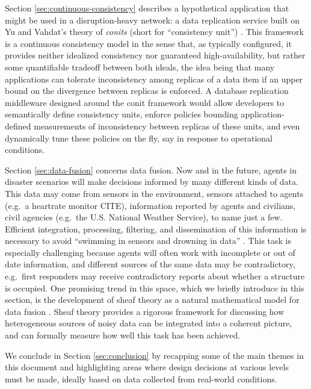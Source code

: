 \documentclass[]             %
{NASA}                       %
\theoremstyle{definition}
\begin{document}
Section \ref{sec:continuous-consistency} describes a hypothetical
application that might be used in a disruption-heavy network: a data
replication service built on Yu and Vahdat's theory of \emph{conits}
(short for ``consistency unit'') \cite{2002tact}. This framework is a
continuous consistency model in the sense that, as typically
configured, it provides neither idealized consistency nor guaranteed
high-availability, but rather some quantifiable tradeoff between both
ideals, the idea being that many applications can tolerate
inconsistency among replicas of a data item if an upper bound on the
divergence between replicas is enforced. A database replication
middleware designed around the conit framework would allow developers
to semantically define consistency units, enforce policies bounding
application-defined measurements of inconsistency between replicas of
these units, and even dynamically tune these policies on the fly, say
in response to operational conditions.

Section \ref{sec:data-fusion} concerns data fusion. Now and in the
future, agents in disaster scenarios will make decisions informed by
many different kinds of data. This data may come from sensors in the
environment, sensors attached to agents (e.g.~a heartrate monitor
CITE), information reported by agents and civilians, civil agencies
(e.g.~the U.S. National Weather Service), to name just a
few. Efficient integration, processing, filtering, and dissemination
of this information is necessary to avoid ``swimming in sensors and
drowning in data'' \cite{2010:magnuson}.  This task is especially
challenging because agents will often work with incomplete or out of
date information, and different sources of the same data may be
contradictory, e.g.~first responders may receive contradictory reports
about whether a structure is occupied. One promising trend in this
space, which we briefly introduce in this section, is the development
of sheaf theory as a natural mathematical model for data fusion
\cite{2017robinsonCanonical}. Sheaf theory provides a rigorous
framework for discussing how heterogeneous sources of noisy data can
be integrated into a coherent picture, and can formally measure how
well this task has been achieved.

We conclude in Section \ref{sec:conclusion} by recapping some of the
main themes in this document and highlighting areas where design
decisions at various levels must be made, ideally based on data
collected from real-world conditions.

\newpage
\end{document}
